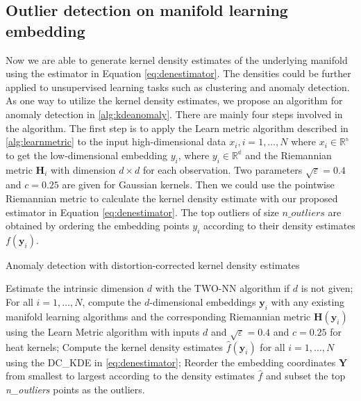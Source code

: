 \documentclass[11pt,a4paper,]{article}
\begin{document}
\hypertarget{outlier-detection-on-manifold-learning-embedding}{%
\subsection{Outlier detection on manifold learning embedding}\label{outlier-detection-on-manifold-learning-embedding}}

Now we are able to generate kernel density estimates of the underlying manifold using the estimator in Equation \eqref{eq:denestimator}. The densities could be further applied to unsupervised learning tasks such as clustering and anomaly detection. As one way to utilize the kernel density estimates, we propose an algorithm for anomaly detection in \ref{alg:kdeanomaly}.
There are mainly four steps involved in the algorithm. The first step is to apply the Learn metric algorithm described in \ref{alg:learnmetric} to the input high-dimensional data \(x_i,i=1,\ldots,N\) where \(x_i\in \mathbb{R^s}\) to get the low-dimensional embedding \(y_i\), where \(y_i\in \mathbb{R^d}\) and the Riemannian metric \(\pmb{H}_i\) with dimension \(d\times d\) for each observation. Two parameters \(\sqrt{\varepsilon} = 0.4\) and \(c=0.25\) are given for Gaussian kernels. Then we could use the pointwise Riemannian metric to calculate the kernel density estimate with our proposed estimator in Equation \eqref{eq:denestimator}. The top outliers of size \(n\_outliers\) are obtained by ordering the embedding points \(y_i\) according to their density estimates \(f(\pmb{y}_i)\).

\begin{algorithm}[!htb]
  \caption{Anomaly detection with distortion-corrected kernel density estimates}
  \label{alg:kdeanomaly}
  \DontPrintSemicolon
  \SetAlgoLined
  \BlankLine
  \begin{algorithmic}[1]
  \STATE Estimate the intrinsic dimension $d$ with the TWO-NN algorithm if $d$ is not given;
  \STATE For all $i=1,\dots,N$, compute the $d$-dimensional embeddings $\pmb{y}_i$ with any existing manifold learning algorithms and the corresponding Riemannian metric $\pmb{H}(\pmb{y}_i)$ using the Learn Metric algorithm with inputs $d$ and $\sqrt{\varepsilon} = 0.4$ and $c=0.25$ for heat kernels;
  \STATE Compute the kernel density estimates $\hat{f}(\pmb{y}_i)$ for all $i=1,\dots,N$ using the DC\_KDE in \ref{eq:denestimator};
  \STATE Reorder the embedding coordinates $\pmb{Y}$ from smallest to largest according to the density estimates $\hat{f}$ and subset the top \textit{n\_outliers} points as the outliers.
  \end{algorithmic}
\end{algorithm}
\end{document}
